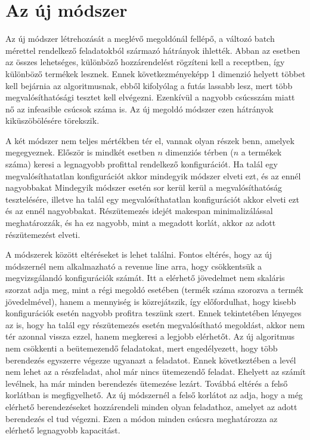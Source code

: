 \chapter{Az új módszer}
Az új módszer létrehozását a meglévő megoldónál fellépő, a változó batch mérettel rendelkező feladatokból származó hátrányok ihlették. Abban az esetben az összes lehetséges, különböző hozzárendelést rögzíteni kell a receptben, így különböző termékek lesznek. Ennek következményeképp 1 dimenzió helyett többet kell bejárnia az algoritmusnak, ebből kifolyólag a futás lassabb lesz, mert több megvalósíthatósági tesztet kell elvégezni. Ezenkívül a nagyobb csúcsszám miatt nő az infeasible csúcsok száma is. Az új megoldó módszer ezen hátrányok kiküszöbölésére törekszik. 

A két módszer nem teljes mértékben tér el, vannak olyan részek benn, amelyek megegyeznek. Először is mindkét esetben $n$ dimenziós térben ($n$ a termékek száma) keresi a legnagyobb profittal rendelkező konfigurációt. Ha talál egy megvalósíthatatlan konfigurációt akkor mindegyik módszer elveti ezt, és az ennél nagyobbakat Mindegyik módszer esetén sor kerül kerül a megvalósíthatóság tesztelésére, illetve ha talál egy megvalósíthatatlan konfigurációt akkor elveti ezt és az ennél nagyobbakat. Részütemezés idejét makespan minimalizálással meghatározzák, és ha ez nagyobb, mint a megadott korlát, akkor az adott részütemezést elveti. 

A módszerek között eltéréseket is lehet találni. Fontos eltérés, hogy az új módszernél nem alkalmazható a revenue line arra, hogy csökkentsük a megvizsgálandó konfigurációk számát. Itt a elérhető jövedelmet nem skaláris szorzat adja meg, mint a régi megoldó esetében (termék száma szorozva a termék jövedelmével), hanem a mennyiség is közrejátszik, így előfordulhat, hogy kisebb konfigurációk esetén nagyobb profitra teszünk szert. Ennek tekintetében lényeges az is, hogy ha talál egy részütemezés esetén megvalósítható megoldást, akkor nem tér azonnal vissza ezzel, hanem megkeresi a legjobb elérhetőt. Az új algoritmus nem csökkenti a beütemezendő feladatokat, mert engedélyezett, hogy több berendezés egyszerre végezze ugyanazt a feladatot. Ennek következtében a levél nem lehet az a részfeladat, ahol már nincs ütemezendő feladat. Ehelyett az számít levélnek, ha már minden berendezés ütemezése lezárt. Továbbá eltérés a felső korlátban is megfigyelhető. Az új módszernél a felső korlátot az adja, hogy a még elérhető berendezéseket hozzárendeli minden olyan feladathoz, amelyet az adott berendezés el tud végezni. Ezen a módon minden csúcsra meghatározza az elérhető legnagyobb kapacitást.

